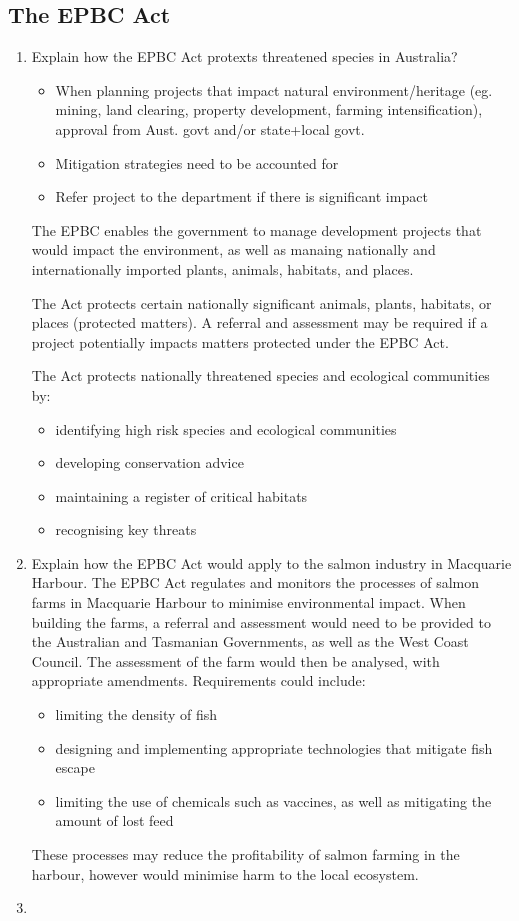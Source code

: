 	\subsection{The EPBC Act}
		\begin{enumerate}
			\item Explain how the EPBC Act protexts threatened species in Australia?
				\begin{itemize}
					\item When planning projects that impact natural environment/heritage (eg. mining, land clearing, property development, farming intensification), approval from Aust. govt and/or state+local govt.
					\item Mitigation strategies need to be accounted for
					\item Refer project to the department if there is significant impact
				\end{itemize}
				\subitem The EPBC enables the government to manage development projects that would impact the environment, as well as manaing nationally and internationally imported plants, animals, habitats, and places.
				
				The Act protects certain nationally significant animals, plants, habitats, or places (protected matters). A referral and assessment may be required if a project potentially impacts matters protected under the EPBC Act.

				The Act protects nationally threatened species and ecological communities by:
				\begin{itemize}
					\item identifying high risk species and ecological communities
					\item developing conservation advice
					\item maintaining a register of critical habitats
					\item recognising key threats
				\end{itemize}
			\item Explain how the EPBC Act would apply to the salmon industry in Macquarie Harbour.
			\subitem The EPBC Act regulates and monitors the processes of salmon farms in Macquarie Harbour to minimise environmental impact. When building the farms, a referral and assessment would need to be provided to the Australian and Tasmanian Governments, as well as the West Coast Council. The assessment of the farm would then be analysed, with appropriate amendments. Requirements could include:
			\begin{itemize}
				\item limiting the density of fish
				\item designing and implementing appropriate technologies that mitigate fish escape
				\item limiting the use of chemicals such as vaccines, as well as mitigating the amount of lost feed
			\end{itemize}
			These processes may reduce the profitability of salmon farming in the harbour, however would minimise harm to the local ecosystem.
			\item 
		\end{enumerate}

